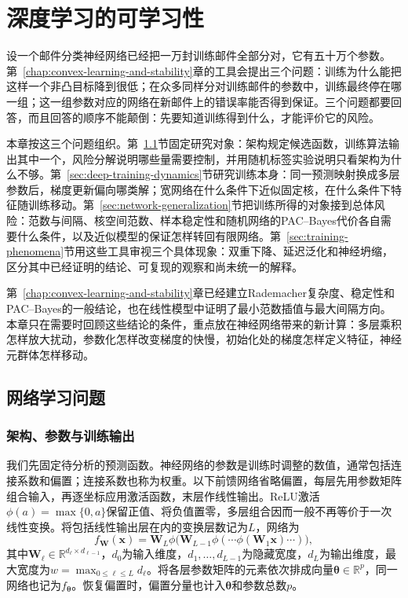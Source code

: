 \chapter{深度学习的可学习性}
\label{chap:deep-learning-theory}

设一个邮件分类神经网络已经把一万封训练邮件全部分对，它有五十万个参数。第~\ref{chap:convex-learning-and-stability}章的工具会提出三个问题：训练为什么能把这样一个非凸目标降到很低；在众多同样分对训练邮件的参数中，训练最终停在哪一组；这一组参数对应的网络在新邮件上的错误率能否得到保证。三个问题都要回答，而且回答的顺序不能颠倒：先要知道训练得到什么，才能评价它的风险。

本章按这三个问题组织。第~\ref{sec:network-learning-problem}节固定研究对象：架构规定候选函数，训练算法输出其中一个，风险分解说明哪些量需要控制，并用随机标签实验说明只看架构为什么不够。第~\ref{sec:deep-training-dynamics}节研究训练本身：同一预测映射换成多层参数后，梯度更新偏向哪类解；宽网络在什么条件下近似固定核，在什么条件下特征随训练移动。第~\ref{sec:network-generalization}节把训练所得的对象接到总体风险：范数与间隔、核空间范数、样本稳定性和随机网络的PAC--Bayes代价各自需要什么条件，以及近似模型的保证怎样转回有限网络。第~\ref{sec:training-phenomena}节用这些工具审视三个具体现象：双重下降、延迟泛化和神经坍缩，区分其中已经证明的结论、可复现的观察和尚未统一的解释。

第~\ref{chap:convex-learning-and-stability}章已经建立Rademacher复杂度、稳定性和PAC--Bayes的一般结论，也在线性模型中证明了最小范数插值与最大间隔方向。本章只在需要时回顾这些结论的条件，重点放在神经网络带来的新计算：多层乘积怎样放大扰动，参数化怎样改变梯度的快慢，初始化处的梯度怎样定义特征，神经元群体怎样移动。

\section{网络学习问题}
\label{sec:network-learning-problem}

\subsection{架构、参数与训练输出}

我们先固定待分析的预测函数。神经网络的参数是训练时调整的数值，通常包括连接系数和偏置；连接系数也称为权重。以下前馈网络省略偏置，每层先用参数矩阵组合输入，再逐坐标应用激活函数，末层作线性输出。ReLU激活$\phi(a)=\max\{0,a\}$保留正值、将负值置零，多层组合因而一般不再等价于一次线性变换。将包括线性输出层在内的变换层数记为$L$，网络为
\begin{equation}
 f_{\bm W}(\bm x)=\bm W_L\phi\bigl(\bm W_{L-1}\phi(\cdots\phi(\bm W_1\bm x)\cdots)\bigr),
 \label{eq:feedforward-network}
\end{equation}
其中$\bm W_\ell\in\mathbb R^{d_\ell\times d_{\ell-1}}$，$d_0$为输入维度，$d_1,\ldots,d_{L-1}$为隐藏宽度，$d_L$为输出维度，最大宽度为$w=\max_{0\leq\ell\leq L}d_\ell$。将各层参数矩阵的元素依次排成向量$\bm\theta\in\mathbb R^p$，同一网络也记为$f_{\bm\theta}$。恢复偏置时，偏置分量也计入$\bm\theta$和参数总数$p$。


